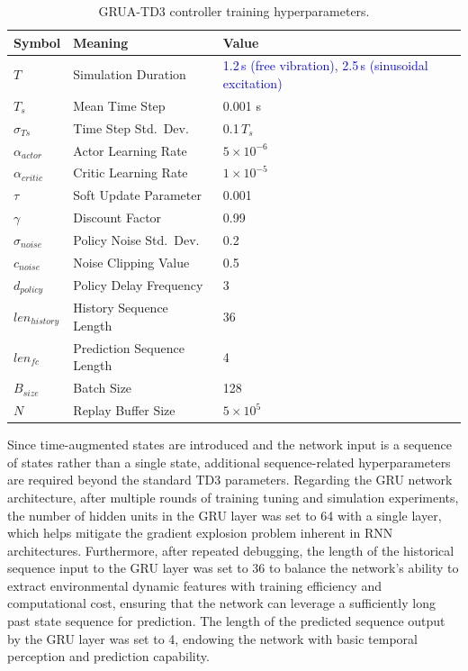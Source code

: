 \documentclass[review]{elsarticle}
\begin{document}
\begin{table}[htbp]
\centering
\caption{GRUA-TD3 controller training hyperparameters.}
\label{tab:hyperparams}
\begin{tabular}{lll} 
\toprule   
Symbol & Meaning & Value \\  
\midrule   
$T$ & Simulation Duration & \textcolor{blue}{1.2\,s (free vibration), 2.5\,s (sinusoidal excitation)} \\
${T}_{s}$ & Mean Time Step & 0.001 s \\
${\sigma }_{Ts}$ & Time Step Std.\ Dev. & 0.1\,${T}_{s}$ \\
${\alpha }_{actor}$ & Actor Learning Rate & $5\times10^{-6}$ \\
${\alpha }_{critic}$ & Critic Learning Rate & $1\times10^{-5}$ \\
$\tau$ & Soft Update Parameter & 0.001 \\
$\gamma$ & Discount Factor & 0.99 \\
${\sigma }_{noise}$ & Policy Noise Std.\ Dev. & 0.2 \\
${c}_{noise}$ & Noise Clipping Value & 0.5 \\
${d}_{policy}$ & Policy Delay Frequency & 3 \\
$len_{history}$ & History Sequence Length & 36 \\
$len_{fc}$ & Prediction Sequence Length & 4 \\
${B}_{size}$ & Batch Size & 128 \\
$N$ & Replay Buffer Size & $5\times10^{5}$ \\
\bottomrule  
\end{tabular}
\end{table}

Since time-augmented states are introduced and the network input is a sequence of states rather than a single state, additional sequence-related hyperparameters are required beyond the standard TD3 parameters. Regarding the GRU network architecture, after multiple rounds of training tuning and simulation experiments, the number of hidden units in the GRU layer was set to 64 with a single layer, which helps mitigate the gradient explosion problem inherent in RNN architectures. Furthermore, after repeated debugging, the length of the historical sequence input to the GRU layer was set to 36 to balance the network's ability to extract environmental dynamic features with training efficiency and computational cost, ensuring that the network can leverage a sufficiently long past state sequence for prediction. The length of the predicted sequence output by the GRU layer was set to 4, endowing the network with basic temporal perception and prediction capability.
\end{document}
